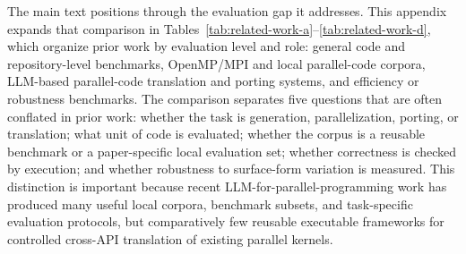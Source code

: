 The main text positions \parbench{} through the evaluation gap it addresses. 
This appendix expands that comparison in Tables~\ref{tab:related-work-a}--\ref{tab:related-work-d}, which organize prior work by evaluation level and role: general code and repository-level benchmarks, OpenMP/MPI and local parallel-code corpora, LLM-based parallel-code translation and porting systems, and efficiency or robustness benchmarks. 
The comparison separates five questions that are often conflated in prior work: whether the task is generation, parallelization, porting, or translation; what unit of code is evaluated; whether the corpus is a reusable benchmark or a paper-specific local evaluation set; whether correctness is checked by execution; and whether robustness to surface-form variation is measured. 
This distinction is important because recent LLM-for-parallel-programming work has produced many useful local corpora, benchmark subsets, and task-specific evaluation protocols, but comparatively few reusable executable frameworks for controlled cross-API translation of existing parallel kernels.

